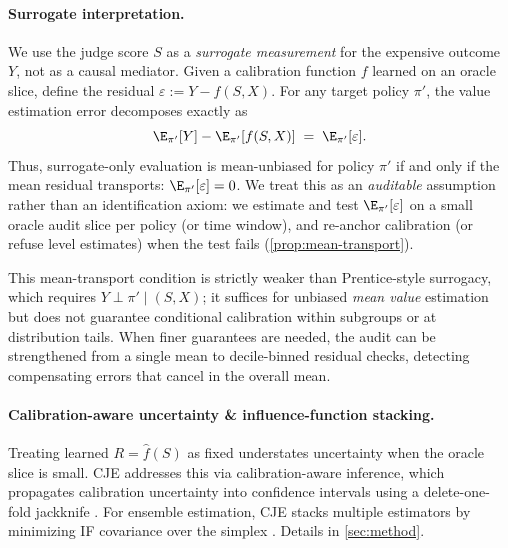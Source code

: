 \paragraph{Surrogate interpretation.}
We use the judge score $S$ as a \emph{surrogate measurement} for the expensive outcome $Y$, not as a causal mediator.
Given a calibration function $f$ learned on an oracle slice, define the residual $\varepsilon := Y - f(S,X)$.
For any target policy $\pi'$, the value estimation error decomposes exactly as
\begin{equation}
\label{eq:transport-decomp}
\E_{\pi'}[Y] - \E_{\pi'}[f(S,X)] \;=\; \E_{\pi'}[\varepsilon].
\end{equation}
Thus, surrogate-only evaluation is mean-unbiased for policy $\pi'$ if and only if the mean residual transports: $\E_{\pi'}[\varepsilon] = 0$.
We treat this as an \emph{auditable} assumption rather than an identification axiom: we estimate and test $\E_{\pi'}[\varepsilon]$ on a small oracle audit slice per policy (or time window), and re-anchor calibration (or refuse level estimates) when the test fails (\cref{prop:mean-transport}).

This mean-transport condition is strictly weaker than Prentice-style surrogacy, which requires $Y \perp \pi' \mid (S, X)$; it suffices for unbiased \emph{mean value} estimation but does not guarantee conditional calibration within subgroups or at distribution tails.
When finer guarantees are needed, the audit can be strengthened from a single mean to decile-binned residual checks, detecting compensating errors that cancel in the overall mean.


\paragraph{Calibration-aware uncertainty \& influence-function stacking.}
Treating learned $R=\hat f(S)$ as fixed understates uncertainty when the oracle slice is small. CJE addresses this via calibration-aware inference, which propagates calibration uncertainty into confidence intervals using a delete-one-fold jackknife \citep{EfronStein1981,Bickel1993}. For ensemble estimation, CJE stacks multiple estimators by minimizing IF covariance over the simplex \citep{Wolpert1992StackedGeneralization,vanderLaan2007SuperLearner}. Details in \cref{sec:method}.
